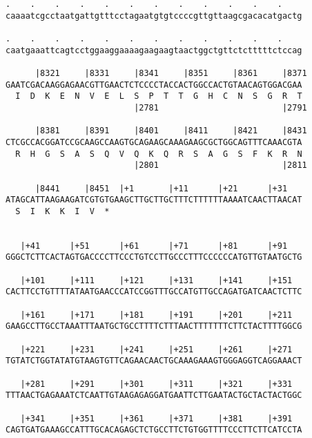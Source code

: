 \documentclass{article}
\begin{document}
\begin{Verbatim}
.    .    .    .    .    .    .    .    .    .    .    .    
caaaatcgcctaatgattgtttcctagaatgtgtccccgttgttaagcgacacatgactg
                                                            
.    .    .    .    .    .    .    .    .    .    .    .    
caatgaaattcagtcctggaaggaaaagaagaagtaactggctgttctctttttctccag
                                                            
      |8321     |8331     |8341     |8351     |8361     |8371
GAATCGACAAGGAGAACGTTGAACTCTCCCCTACCACTGGCCACTGTAACAGTGGACGAA
  I  D  K  E  N  V  E  L  S  P  T  T  G  H  C  N  S  G  R  T
                          |2781                         |2791
  
      |8381     |8391     |8401     |8411     |8421     |8431
CTCGCCACGGATCCGCAAGCCAAGTGCAGAAGCAAAGAAGCGCTGGCAGTTTCAAACGTA
  R  H  G  S  A  S  Q  V  Q  K  Q  R  S  A  G  S  F  K  R  N
                          |2801                         |2811
  
      |8441     |8451  |+1       |+11      |+21      |+31   
ATAGCATTAAGAAGATCGTGTGAAGCTTGCTTGCTTTCTTTTTTAAAATCAACTTAACAT
  S  I  K  K  I  V  *   
                                                            
  
   |+41      |+51      |+61      |+71      |+81      |+91   
GGGCTCTTCACTAGTGACCCCTTCCCTGTCCTTGCCCTTTCCCCCCATGTTGTAATGCTG
                                                            
   |+101     |+111     |+121     |+131     |+141     |+151  
CACTTCCTGTTTTATAATGAACCCATCCGGTTTGCCATGTTGCCAGATGATCAACTCTTC
                                                            
   |+161     |+171     |+181     |+191     |+201     |+211  
GAAGCCTTGCCTAAATTTAATGCTGCCTTTTCTTTAACTTTTTTTCTTCTACTTTTGGCG
                                                            
   |+221     |+231     |+241     |+251     |+261     |+271  
TGTATCTGGTATATGTAAGTGTTCAGAACAACTGCAAAGAAAGTGGGAGGTCAGGAAACT
                                                            
   |+281     |+291     |+301     |+311     |+321     |+331  
TTTAACTGAGAAATCTCAATTGTAAGAGAGGATGAATTCTTGAATACTGCTACTACTGGC
                                                            
   |+341     |+351     |+361     |+371     |+381     |+391  
CAGTGATGAAAGCCATTTGCACAGAGCTCTGCCTTCTGTGGTTTTCCCTTCTTCATCCTA
                                                            

\end{Verbatim}
\end{document}
